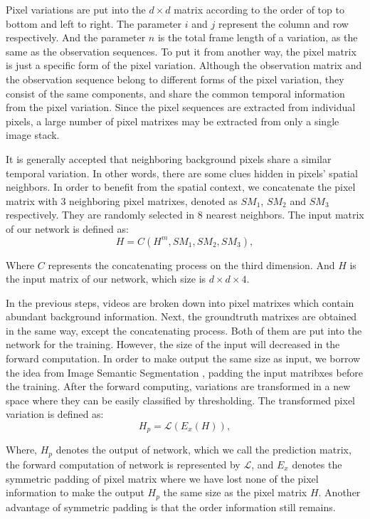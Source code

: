 \documentclass[journal]{IEEEtran}
\begin{document}
Pixel variations are put into the $d\times d$ matrix according to the order of top to bottom and left to right. 
The parameter $i$ and $j$ represent the column and row respectively. 
And the parameter $n$ is the total frame length of a variation, as the same as the observation sequences. 
To put it from another way, the pixel matrix is just a specific form of the pixel variation. 
Although the observation matrix and the observation sequence belong to different forms of the pixel variation, they consist of the same components, and share the common temporal information from the pixel variation. 
Since the pixel sequences are extracted from individual pixels, a large number of pixel matrixes may be extracted from only a single image stack.

It is generally accepted that neighboring background pixels share a similar temporal variation.
In other words, there are some clues hidden in pixels' spatial neighbors. 
In order to benefit from the spatial context, we concatenate the pixel matrix with 3 neighboring pixel matrixes, denoted as $SM_1$, $SM_2$ and $SM_3$ respectively.
They are randomly selected in 8 nearest neighbors. 
The input matrix of our network is defined as:
\begin{equation}
H = C(H^m, SM_1, SM_2, SM_3),
\end{equation}

Where $C$ represents the concatenating process on the third dimension.
And $H$ is the input matrix of our network, which size is $d\times d\times 4$.

In the previous steps, videos are broken down into pixel matrixes which contain abundant background information. 
Next, the groundtruth matrixes are obtained in the same way, except the concatenating process. 
Both of them are put into the network for the training. 
However, the size of the input will decreased in the forward computation. 
In order to make output the same size as input, we borrow the idea from Image Semantic Segmentation \cite{Shelhamer2017fcn}, padding the input matribxes before the training. 
After the forward computing, variations are transformed in a new space where they can be easily classified by thresholding. 
The transformed pixel variation is defined as:
\begin{equation}
H_p= \mathcal L (E_x (H)),
\end{equation}

Where, $H_p$ denotes the output of network, which we call the prediction matrix, the forward computation of network is represented by $\mathcal L$, and $E_x$ denotes the symmetric padding of pixel matrix where we have lost none of the pixel information to make the output $H_p$ the same size as the pixel matrix $H$. 
Another advantage of symmetric padding is that the order information still remains.
\end{document}

